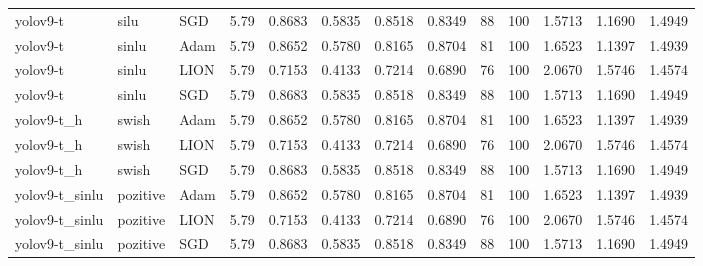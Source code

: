 \begin{table}[htbp]
{\begin{tabular}{lllrrrrrrrrrr}
yolov9-t & silu & SGD & 5.79 & 0.8683 & 0.5835 & 0.8518 & 0.8349 & 88 & 100 & 1.5713 & 1.1690 & 1.4949 \\
yolov9-t & sinlu & Adam & 5.79 & 0.8652 & 0.5780 & 0.8165 & 0.8704 & 81 & 100 & 1.6523 & 1.1397 & 1.4939 \\
yolov9-t & sinlu & LION & 5.79 & 0.7153 & 0.4133 & 0.7214 & 0.6890 & 76 & 100 & 2.0670 & 1.5746 & 1.4574 \\
yolov9-t & sinlu & SGD & 5.79 & 0.8683 & 0.5835 & 0.8518 & 0.8349 & 88 & 100 & 1.5713 & 1.1690 & 1.4949 \\
yolov9-t_h & swish & Adam & 5.79 & 0.8652 & 0.5780 & 0.8165 & 0.8704 & 81 & 100 & 1.6523 & 1.1397 & 1.4939 \\
yolov9-t_h & swish & LION & 5.79 & 0.7153 & 0.4133 & 0.7214 & 0.6890 & 76 & 100 & 2.0670 & 1.5746 & 1.4574 \\
yolov9-t_h & swish & SGD & 5.79 & 0.8683 & 0.5835 & 0.8518 & 0.8349 & 88 & 100 & 1.5713 & 1.1690 & 1.4949 \\
yolov9-t_sinlu & pozitive & Adam & 5.79 & 0.8652 & 0.5780 & 0.8165 & 0.8704 & 81 & 100 & 1.6523 & 1.1397 & 1.4939 \\
yolov9-t_sinlu & pozitive & LION & 5.79 & 0.7153 & 0.4133 & 0.7214 & 0.6890 & 76 & 100 & 2.0670 & 1.5746 & 1.4574 \\
yolov9-t_sinlu & pozitive & SGD & 5.79 & 0.8683 & 0.5835 & 0.8518 & 0.8349 & 88 & 100 & 1.5713 & 1.1690 & 1.4949 \\
\bottomrule
\end{tabular}
}
\end{table}
